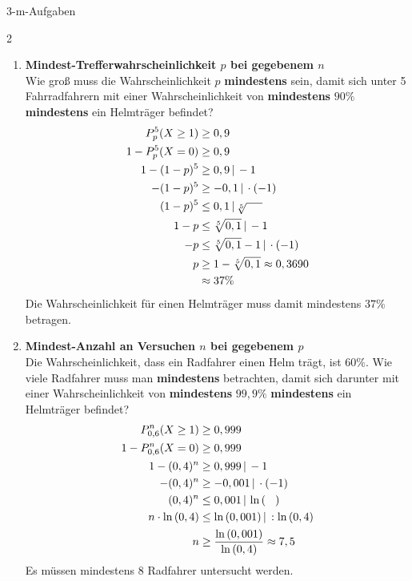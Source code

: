 \begin{bem}{3-m-Aufgaben}{}
\setlength{\columnsep}{10mm}
\begin{multicols}{2}
\begin{enumerate}
    \item \textbf{Mindest-Trefferwahrscheinlichkeit $p$ bei gegebenem $n$}\\
    Wie groß muss die Wahrscheinlichkeit \(p\) \textbf{mindestens} sein, damit sich unter 5 Fahrradfahrern mit einer Wahrscheinlichkeit von \textbf{mindestens} \(90\%\) \textbf{mindestens} ein Helmträger befindet?
    \begin{equation*}
        \begin{split}
            P^5_p(X\geq 1) &\geq 0,9\\
            1-P^5_p(X=0)&\geq 0,9\\
            1-(1-p)^5 &\geq 0,9 \,|\, -1\\
            -(1-p)^5 &\geq -0,1 \,|\, \cdot(-1)\\
            (1-p)^5 &\leq 0,1 \,|\, \sqrt[5]{\hspace{0.5cm}}\\ 
            1-p &\leq \sqrt[5]{0,1} \,|\, -1 \\
            -p &\leq \sqrt[5]{0,1} -1 \,|\, \cdot (-1)\\
            p&\geq 1-\sqrt[5]{0,1} \approx 0,3690\\ &\approx 37\%
        \end{split}
    \end{equation*}
    Die Wahrscheinlichkeit für einen Helmträger muss damit mindestens \(37\%\) betragen.
    \item \textbf{Mindest-Anzahl an Versuchen $n$ bei gegebenem $p$}\\
    Die Wahrscheinlichkeit, dass ein Radfahrer einen Helm trägt, ist \(60\%\). Wie viele Radfahrer muss man \textbf{mindestens} betrachten, damit sich darunter mit einer Wahrscheinlichkeit von \textbf{mindestens} \(99,9\%\) \textbf{mindestens} ein Helmträger befindet? 
    \begin{equation*}
        \begin{split}
            P^n_{0,6}(X\geq 1) &\geq 0,999\\
            1-P^n_{0,6}(X=0)&\geq 0,999\\
            1-(0,4)^n &\geq 0,999 \,|\, -1\\
            -(0,4)^n &\geq -0,001 \,|\, \cdot (-1)\\
            (0,4)^n &\leq 0,001\,|\, \ln{(\hspace{0.3cm})}\\
            n\cdot \ln{(0,4)} &\leq \ln{(0,001)}\,|\, : \ln{(0,4)}\\
           n&\geq \frac{\ln{(0,001)}}{\ln{(0,4)}} \approx 7,5
        \end{split}
    \end{equation*}
    Es müssen mindestens 8 Radfahrer untersucht werden.
\end{enumerate}
\end{multicols}
\end{bem}
